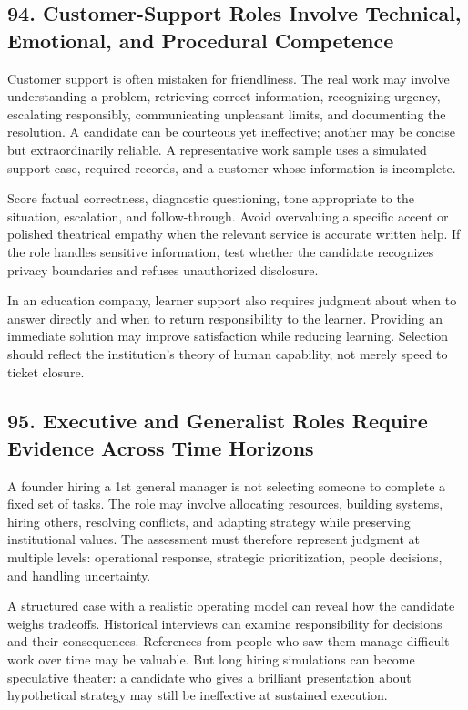 \subsection*{94. Customer-Support Roles Involve Technical, Emotional, and Procedural Competence}

Customer support is often mistaken for friendliness. The real work may involve understanding a problem, retrieving correct information, recognizing urgency, escalating responsibly, communicating unpleasant limits, and documenting the resolution. A candidate can be courteous yet ineffective; another may be concise but extraordinarily reliable. A representative work sample uses a simulated support case, required records, and a customer whose information is incomplete.

Score factual correctness, diagnostic questioning, tone appropriate to the situation, escalation, and follow-through. Avoid overvaluing a specific accent or polished theatrical empathy when the relevant service is accurate written help. If the role handles sensitive information, test whether the candidate recognizes privacy boundaries and refuses unauthorized disclosure.

In an education company, learner support also requires judgment about when to answer directly and when to return responsibility to the learner. Providing an immediate solution may improve satisfaction while reducing learning. Selection should reflect the institution's theory of human capability, not merely speed to ticket closure.

\subsection*{95. Executive and Generalist Roles Require Evidence Across Time Horizons}

A founder hiring a 1st general manager is not selecting someone to complete a fixed set of tasks. The role may involve allocating resources, building systems, hiring others, resolving conflicts, and adapting strategy while preserving institutional values. The assessment must therefore represent judgment at multiple levels: operational response, strategic prioritization, people decisions, and handling uncertainty.

A structured case with a realistic operating model can reveal how the candidate weighs tradeoffs. Historical interviews can examine responsibility for decisions and their consequences. References from people who saw them manage difficult work over time may be valuable. But long hiring simulations can become speculative theater: a candidate who gives a brilliant presentation about hypothetical strategy may still be ineffective at sustained execution.

